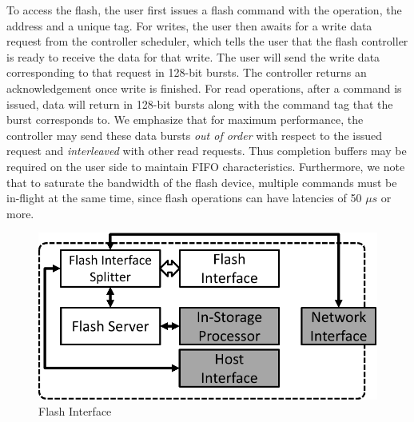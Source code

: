 To access the flash, the user first issues a flash command
with the operation, the address and a unique tag.
For writes, the user then awaits for a write data request from
the controller scheduler, which tells the user that the flash controller is
ready to receive the data for that write. The user will send the write data
corresponding to that request in 128-bit bursts. The controller returns an
acknowledgement once write is finished. 
For read operations, after a command is issued,
data will return in 128-bit bursts along with the command tag that the
burst corresponds to. We emphasize that for maximum performance, the
controller may send these data bursts \emph{out of order} with respect to
the issued request and \emph{interleaved} with other read requests.
Thus completion buffers may be required on the user side to maintain FIFO
characteristics. Furthermore,
we note that to saturate the bandwidth of the flash device, multiple
commands must be in-flight at the same time, since flash operations
can have latencies of 50 $\mu s$ or more. 


\begin{figure}[h]
	\begin{center}
	\includegraphics[scale=0.4]{figures/architecture_flash-crop.pdf}
	\caption{Flash Interface}
	\label{fig:flashinterface}
	\end{center}
\end{figure}

